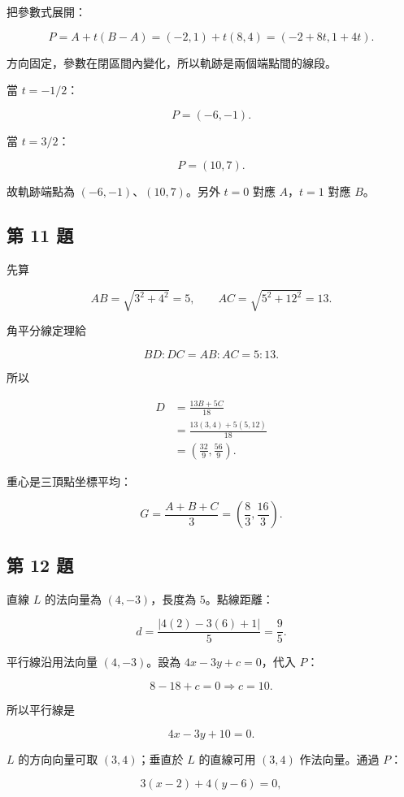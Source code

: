\documentclass[11pt,a4paper]{article}
\begin{document}
把參數式展開：

\[
P=A+t(B-A)
=(-2,1)+t(8,4)
=(-2+8t,1+4t).
\]

方向固定，參數在閉區間內變化，所以軌跡是兩個端點間的線段。

當 \(t=-1/2\)：

\[
P=(-6,-1).
\]

當 \(t=3/2\)：

\[
P=(10,7).
\]

故軌跡端點為 \(\boxed{(-6,-1)}\)、\(\boxed{(10,7)}\)。另外 \(t=0\) 對應 \(A\)，\(t=1\) 對應 \(B\)。

\subsection{第 11 題}\label{ux7b2c-11-ux984c}

先算

\[
AB=\sqrt{3^2+4^2}=5,
\qquad
AC=\sqrt{5^2+12^2}=13.
\]

角平分線定理給

\[
BD:DC=AB:AC=5:13.
\]

所以

\[
\begin{aligned}
D
&=\frac{13B+5C}{18}\\
&=\frac{13(3,4)+5(5,12)}{18}\\
&=\boxed{\left(\frac{32}{9},\frac{56}{9}\right)}.
\end{aligned}
\]

重心是三頂點坐標平均：

\[
G=\frac{A+B+C}{3}
=\boxed{\left(\frac83,\frac{16}{3}\right)}.
\]

\subsection{第 12 題}\label{ux7b2c-12-ux984c}

直線 \(L\) 的法向量為 \((4,-3)\)，長度為 \(5\)。點線距離：

\[
d=\frac{|4(2)-3(6)+1|}{5}
=\boxed{\frac95}.
\]

平行線沿用法向量 \((4,-3)\)。設為 \(4x-3y+c=0\)，代入 \(P\)：

\[
8-18+c=0
\Longrightarrow c=10.
\]

所以平行線是

\[
\boxed{4x-3y+10=0}.
\]

\(L\) 的方向向量可取 \((3,4)\)；垂直於 \(L\) 的直線可用 \((3,4)\) 作法向量。通過 \(P\)：

\[
3(x-2)+4(y-6)=0,
\]
\end{document}
